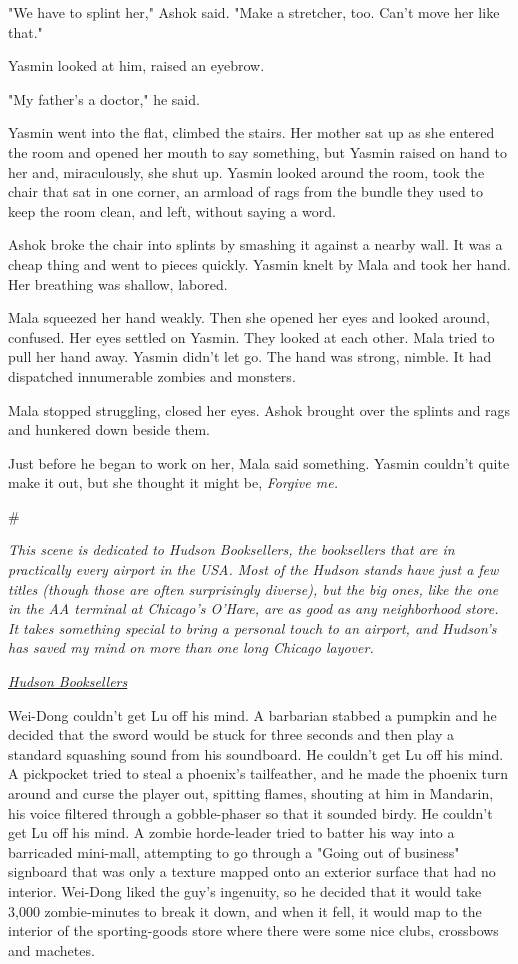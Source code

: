 "We have to splint her," Ashok said. "Make a stretcher, too. Can't
move her like that."

Yasmin looked at him, raised an eyebrow.

"My father's a doctor," he said.

Yasmin went into the flat, climbed the stairs. Her mother sat up as
she entered the room and opened her mouth to say something, but
Yasmin raised on hand to her and, miraculously, she shut up. Yasmin
looked around the room, took the chair that sat in one corner, an
armload of rags from the bundle they used to keep the room clean,
and left, without saying a word.

Ashok broke the chair into splints by smashing it against a nearby
wall. It was a cheap thing and went to pieces quickly. Yasmin knelt
by Mala and took her hand. Her breathing was shallow, labored.

Mala squeezed her hand weakly. Then she opened her eyes and looked
around, confused. Her eyes settled on Yasmin. They looked at each
other. Mala tried to pull her hand away. Yasmin didn't let go. The
hand was strong, nimble. It had dispatched innumerable zombies and
monsters.

Mala stopped struggling, closed her eyes. Ashok brought over the
splints and rags and hunkered down beside them.

Just before he began to work on her, Mala said something. Yasmin
couldn't quite make it out, but she thought it might be,
\emph{Forgive me.}

\#

\emph{This scene is dedicated to Hudson Booksellers, the booksellers that are in practically every airport in the USA. Most of the Hudson stands have just a few titles (though those are often surprisingly diverse), but the big ones, like the one in the AA terminal at Chicago's O'Hare, are as good as any neighborhood store. It takes something special to bring a personal touch to an airport, and Hudson's has saved my mind on more than one long Chicago layover.}

\emph{\href{http://www.hudsongroup.com/HudsonBooksellers_s.html}{Hudson Booksellers}}

Wei-Dong couldn't get Lu off his mind. A barbarian stabbed a
pumpkin and he decided that the sword would be stuck for three
seconds and then play a standard squashing sound from his
soundboard. He couldn't get Lu off his mind. A pickpocket tried to
steal a phoenix's tailfeather, and he made the phoenix turn around
and curse the player out, spitting flames, shouting at him in
Mandarin, his voice filtered through a gobble-phaser so that it
sounded birdy. He couldn't get Lu off his mind. A zombie
horde-leader tried to batter his way into a barricaded mini-mall,
attempting to go through a "Going out of business" signboard that
was only a texture mapped onto an exterior surface that had no
interior. Wei-Dong liked the guy's ingenuity, so he decided that it
would take 3,000 zombie-minutes to break it down, and when it fell,
it would map to the interior of the sporting-goods store where
there were some nice clubs, crossbows and machetes.

